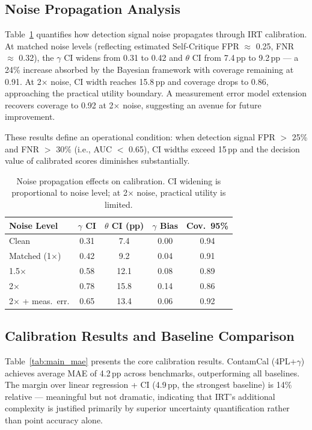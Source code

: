 \documentclass[letterpaper,11pt]{article}
\begin{document}
\subsection{Noise Propagation Analysis}
\label{sec:noise}

Table~\ref{tab:noise} quantifies how detection signal noise propagates through IRT calibration. At matched noise levels (reflecting estimated Self-Critique FPR $\approx$ 0.25, FNR $\approx$ 0.32), the $\gamma$ CI widens from 0.31 to 0.42 and $\theta$ CI from 7.4\,pp to 9.2\,pp --- a 24\% increase absorbed by the Bayesian framework with coverage remaining at 0.91. At 2$\times$ noise, CI width reaches 15.8\,pp and coverage drops to 0.86, approaching the practical utility boundary. A measurement error model extension recovers coverage to 0.92 at 2$\times$ noise, suggesting an avenue for future improvement.

These results define an operational condition: when detection signal FPR $>$ 25\% and FNR $>$ 30\% (i.e., AUC $<$ 0.65), CI widths exceed 15\,pp and the decision value of calibrated scores diminishes substantially.

\begin{table}[t]
\centering
\caption{Noise propagation effects on calibration. CI widening is proportional to noise level; at 2$\times$ noise, practical utility is limited.}
\label{tab:noise}
\small
\begin{tabular}{lcccc}
\toprule
Noise Level & $\gamma$ CI & $\theta$ CI (pp) & $\gamma$ Bias & Cov.\ 95\% \\
\midrule
Clean & 0.31 & 7.4 & 0.00 & 0.94 \\
Matched (1$\times$) & 0.42 & 9.2 & 0.04 & 0.91 \\
1.5$\times$ & 0.58 & 12.1 & 0.08 & 0.89 \\
2$\times$ & 0.78 & 15.8 & 0.14 & 0.86 \\
2$\times$ + meas.\ err. & 0.65 & 13.4 & 0.06 & 0.92 \\
\bottomrule
\end{tabular}
\end{table}

\subsection{Calibration Results and Baseline Comparison}
\label{sec:calibration}

Table~\ref{tab:main_mae} presents the core calibration results. ContamCal (4PL+$\gamma$) achieves average MAE of 4.2\,pp across benchmarks, outperforming all baselines. The margin over linear regression + CI (4.9\,pp, the strongest baseline) is 14\% relative --- meaningful but not dramatic, indicating that IRT's additional complexity is justified primarily by superior uncertainty quantification rather than point accuracy alone.
\end{document}
